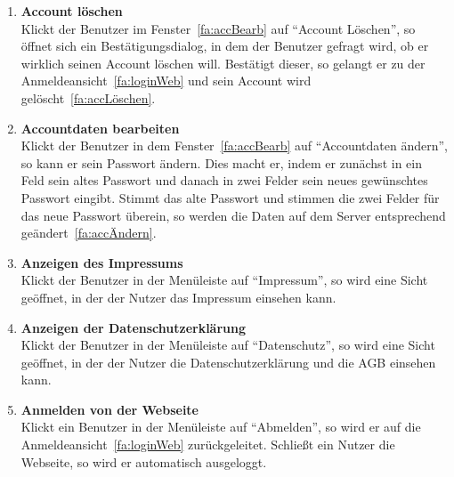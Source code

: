\begin{enumerate}
\item \label{fa:accLöschenWeb}\textbf{Account löschen} \hfill \\
Klickt der Benutzer im Fenster~\eqref{fa:accBearb} auf ``Account Löschen'', so öffnet sich ein Bestätigungsdialog, in dem der Benutzer gefragt wird, ob er wirklich seinen Account löschen will. Bestätigt dieser, so gelangt er zu der Anmeldeansicht~\eqref{fa:loginWeb} und sein Account wird gelöscht~\eqref{fa:accLöschen}.

\item \label{fa:accDatBearb}\textbf{Accountdaten bearbeiten} \hfill \\
Klickt der Benutzer in dem Fenster~\eqref{fa:accBearb} auf ``Accountdaten ändern'', so kann er sein Passwort ändern. Dies macht er, indem er zunächst in ein Feld sein altes Passwort und danach in zwei Felder sein neues gewünschtes Passwort eingibt. Stimmt das alte Passwort und stimmen die zwei Felder für das neue Passwort überein, so werden die Daten auf dem Server entsprechend geändert~\eqref{fa:accÄndern}.

\item \label{fa:impressumWeb} \textbf{Anzeigen des Impressums} \hfill \\
Klickt der Benutzer in der Menüleiste auf ``Impressum'', so wird eine Sicht geöffnet, in der der Nutzer das Impressum einsehen kann.

\item \label{fa:datenschutzWeb} \textbf{Anzeigen der Datenschutzerklärung} \hfill \\
Klickt der Benutzer in der Menüleiste auf ``Datenschutz'', so wird eine Sicht geöffnet, in der der Nutzer die Datenschutzerklärung und die AGB einsehen kann.

\item \label{fa:weblogOut}\textbf{Anmelden von der Webseite} \hfill \\
Klickt ein Benutzer in der Menüleiste auf ``Abmelden'', so wird er auf die Anmeldeansicht~\eqref{fa:loginWeb} zurückgeleitet. Schließt ein Nutzer die Webseite, so wird er automatisch ausgeloggt.

\end{enumerate}